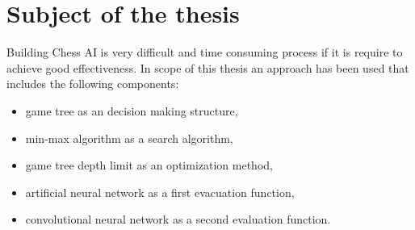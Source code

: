 

\chapter{Subject of the thesis}
Building Chess AI is very difficult and time consuming process if it is require to achieve good effectiveness. In scope of this thesis an approach has been used that includes the following components:
\begin{itemize}
	\item game tree as an decision making structure,
	\item min-max algorithm as a search algorithm,
	\item game tree depth limit as an optimization method,
	\item artificial neural network as a first evacuation function,
	\item convolutional neural network as a second evaluation function.
\end{itemize}


